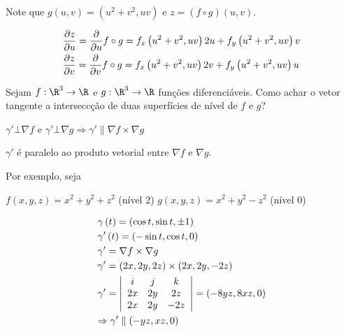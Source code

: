 \documentclass[11pt, oneside, a4paper]{gsm-l}
\begin{document}
\begin{sol}
    Note que $g\left( {u,v} \right) = \left( {u^2  + v^2 ,uv} \right)$ e $z = \left( {f \circ g} \right)\left( {u,v} \right)$.

\[
\begin{gathered}
\frac{{\partial z}}
{{\partial u}} = \frac{\partial }
{{\partial u}}f \circ g = f_x \left( {u^2  + v^2 ,uv} \right)2u + f_y \left( {u^2  + v^2 ,uv} \right)v \hfill \\
\frac{{\partial z}}
{{\partial v}} = \frac{\partial }
{{\partial v}}f \circ g = f_x \left( {u^2  + v^2 ,uv} \right)2v + f_y \left( {u^2  + v^2 ,uv} \right)u \hfill \\
\end{gathered}
\]

\end{sol}

\begin{exem}
    Sejam $f:\R^3  \to \R$ e $g:\R^3  \to \R$ funções diferenciáveis. Como achar o vetor tangente a interseccção de duas superfícies de nível de $f$ e $g$?
\end{exem}

\begin{sol}

    $\gamma ' \bot \nabla f$ e $\gamma ' \bot \nabla g \Rightarrow \gamma '\parallel \nabla f \times \nabla g$

$\gamma '$ é paralelo ao produto vetorial entre $\nabla f$ e $\nabla g$.

Por exemplo, seja

$f\left( {x,y,z} \right) = x^2  + y^2  + z^2$ (nível 2)
$g\left( {x,y,z} \right) = x^2  + y^2  - z^2$ (nível 0)


\[
\begin{gathered}
\gamma \left( t \right) = \left( {\cos t,\sin t, \pm 1} \right) \hfill \\
\gamma '\left( t \right) = \left( { - \sin t,\cos t,0} \right) \hfill \\
\gamma ' = \nabla f \times \nabla g \hfill \\
  \gamma ' = \left( {2x,2y,2z} \right) \times \left( {2x,2y, - 2z} \right) \hfill \\
\gamma ' = \left| {\begin{array}{*{20}c}
i & j & k  \\
{2x} & {2y} & {2z}  \\
{2x} & {2y} & { - 2z}  \\

\end{array} } \right| = \left( { - 8yz,8xz,0} \right) \hfill \\
\Rightarrow \gamma '\parallel \left( { - yz,xz,0} \right) \hfill \\
\end{gathered}
\]

\end{sol}
\end{document}
